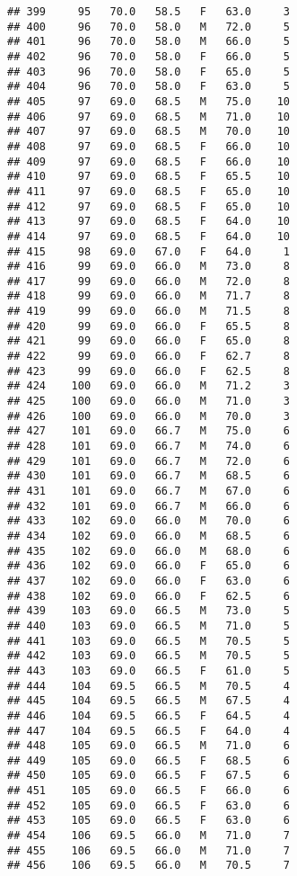\documentclass[
]{article}
\begin{document}
\begin{verbatim}
## 399     95   70.0   58.5   F   63.0     3
## 400     96   70.0   58.0   M   72.0     5
## 401     96   70.0   58.0   M   66.0     5
## 402     96   70.0   58.0   F   66.0     5
## 403     96   70.0   58.0   F   65.0     5
## 404     96   70.0   58.0   F   63.0     5
## 405     97   69.0   68.5   M   75.0    10
## 406     97   69.0   68.5   M   71.0    10
## 407     97   69.0   68.5   M   70.0    10
## 408     97   69.0   68.5   F   66.0    10
## 409     97   69.0   68.5   F   66.0    10
## 410     97   69.0   68.5   F   65.5    10
## 411     97   69.0   68.5   F   65.0    10
## 412     97   69.0   68.5   F   65.0    10
## 413     97   69.0   68.5   F   64.0    10
## 414     97   69.0   68.5   F   64.0    10
## 415     98   69.0   67.0   F   64.0     1
## 416     99   69.0   66.0   M   73.0     8
## 417     99   69.0   66.0   M   72.0     8
## 418     99   69.0   66.0   M   71.7     8
## 419     99   69.0   66.0   M   71.5     8
## 420     99   69.0   66.0   F   65.5     8
## 421     99   69.0   66.0   F   65.0     8
## 422     99   69.0   66.0   F   62.7     8
## 423     99   69.0   66.0   F   62.5     8
## 424    100   69.0   66.0   M   71.2     3
## 425    100   69.0   66.0   M   71.0     3
## 426    100   69.0   66.0   M   70.0     3
## 427    101   69.0   66.7   M   75.0     6
## 428    101   69.0   66.7   M   74.0     6
## 429    101   69.0   66.7   M   72.0     6
## 430    101   69.0   66.7   M   68.5     6
## 431    101   69.0   66.7   M   67.0     6
## 432    101   69.0   66.7   M   66.0     6
## 433    102   69.0   66.0   M   70.0     6
## 434    102   69.0   66.0   M   68.5     6
## 435    102   69.0   66.0   M   68.0     6
## 436    102   69.0   66.0   F   65.0     6
## 437    102   69.0   66.0   F   63.0     6
## 438    102   69.0   66.0   F   62.5     6
## 439    103   69.0   66.5   M   73.0     5
## 440    103   69.0   66.5   M   71.0     5
## 441    103   69.0   66.5   M   70.5     5
## 442    103   69.0   66.5   M   70.5     5
## 443    103   69.0   66.5   F   61.0     5
## 444    104   69.5   66.5   M   70.5     4
## 445    104   69.5   66.5   M   67.5     4
## 446    104   69.5   66.5   F   64.5     4
## 447    104   69.5   66.5   F   64.0     4
## 448    105   69.0   66.5   M   71.0     6
## 449    105   69.0   66.5   F   68.5     6
## 450    105   69.0   66.5   F   67.5     6
## 451    105   69.0   66.5   F   66.0     6
## 452    105   69.0   66.5   F   63.0     6
## 453    105   69.0   66.5   F   63.0     6
## 454    106   69.5   66.0   M   71.0     7
## 455    106   69.5   66.0   M   71.0     7
## 456    106   69.5   66.0   M   70.5     7

\end{verbatim}
\end{document}
